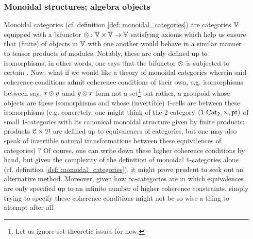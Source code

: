         \subsubsection{Monoidal structures; algebra objects}
            Monoidal categories (cf. definition \ref{def: monoidal_categories}) are categories $\mathbb{V}$ equipped with a bifunctor $\tensor: \V \x \V \to \V$ satisfying axioms which help us ensure that (finite)  of objects in $\mathbb{V}$ with one another would behave in a similar manner to tensor products of modules. Notably, these  are only defined up to isomorphisms; in other words, one says that the bifunctor $\tensor$ is subjected to certain . Now, what if we would like a theory of monoidal categories wherein said coherence conditions admit coherence conditions of their own, e.g. isomorphisms between say, $x \tensor y$ amd $y \tensor x$ form not a set\footnote{Let us ignore set-theoretic issues for now.} but rather, a groupoid whose objects are these isomorphisms and whose (invertible) $1$-cells are  between these isomorphisms (e.g. concretely, one might think of the $2$-category $(1\-\Cat_2, \x, \pt)$ of small $1$-categories with its canonical monoidal structure given by finite products: products $\C \x \D$ are defined up to equivalences of categories, but one may also speak of invertible natural transformations between these equivalences of categories) ? Of course, one can write down these higher coherence conditions by hand, but given the complexity of the definition of monoidal $1$-categories alone (cf. definition \ref{def: monoidal_categories}), it might prove prudent to seek out an alternative method. Moreover, given how $\infty$-categories are  in which equivalences are only specified up to an infinite number of higher coherence constraints, simply trying to specify these coherence conditions might not be so wise a thing to attempt after all.
            

